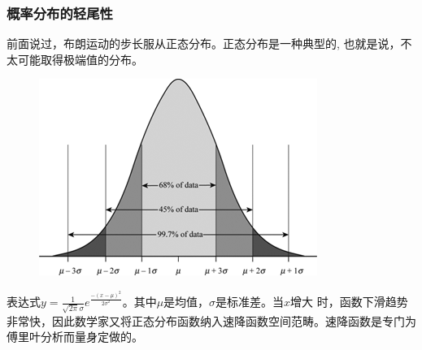 \begin{frame}

\frametitle{概率分布的轻尾性}
\qquad 前面说过，布朗运动的步长服从正态分布。正态分布是一种典型的{\color{red}{轻尾分布}}, 也就是说，不太可能取得极端值的分布。

\begin{figure}
	\centering\includegraphics[scale=0.35]{images/normal_distribution.png}
\end{figure}

表达式$y= \frac{1}{\sqrt{2\pi}\sigma}e^{\frac{-\left ( x-\mu  \right )^{2}}{2\sigma ^{2}}}$。其中$\mu$是均值，$\sigma$是标准差。当$x$增大
时，函数下滑趋势非常快，因此数学家又将正态分布函数纳入速降函数空间范畴。速降函数是专门为傅里叶分析而量身定做的。

\end{frame}

